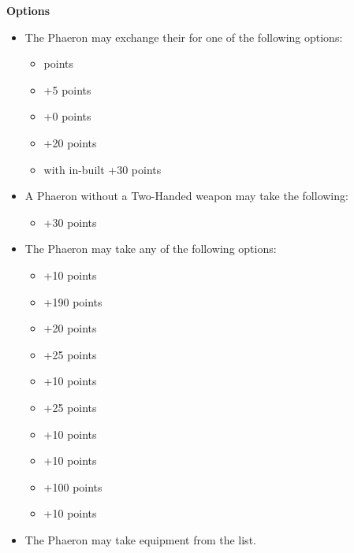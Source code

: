 \begin{minipage}[t]{0.72\textwidth}
	\vspace*{2em}
	\textbf{Options}
	\begin{itemize}
		\item The Phaeron may exchange their  for one of the following options:
		\begin{itemize}			
			\item {}  points
			\item {} \dotfill +5 points
			\item {} \dotfill +0 points
			\item {} \dotfill +20 points
			\item {} with in-built  \dotfill +30 points
		\end{itemize}
		\item A Phaeron without a Two-Handed weapon may take the following:
		\begin{itemize}
			\item {} \dotfill +30 points
		\end{itemize}
		\item The Phaeron may take any of the following options:
		\begin{itemize}
			\item {} \dotfill +10 points
			\item {} \dotfill +190 points
			\item {} \dotfill +20 points
			\item {} \dotfill +25 points
			\item {} \dotfill +10 points
			\item {} \dotfill +25 points
			\item {} \dotfill +10 points
			\item {} \dotfill +10 points
			\item {} \dotfill +100 points
			\item {} \dotfill +10 points
		\end{itemize}
		\item The Phaeron may take equipment from the  list.
	\end{itemize}
\end{minipage}
\hspace{0.5em}

